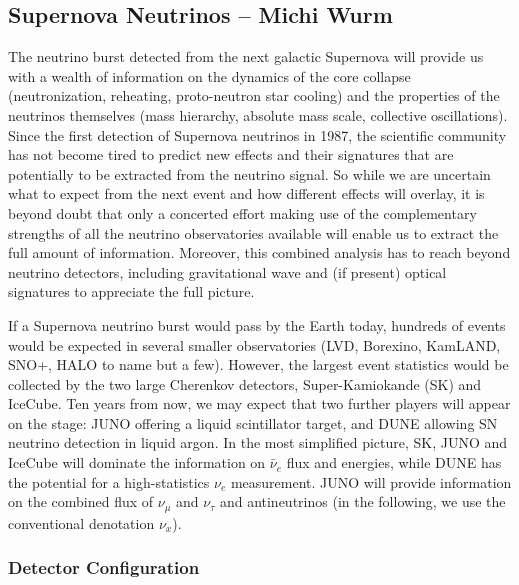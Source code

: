 \subsection{Supernova Neutrinos -- Michi Wurm}


The neutrino burst detected from the next galactic Supernova will provide us with a wealth of information on the dynamics of the core collapse (neutronization, reheating, proto-neutron star cooling) and the properties of the neutrinos themselves (mass hierarchy, absolute mass scale, collective oscillations). Since the first detection of Supernova neutrinos in 1987, the scientific community has not become tired to predict new effects and their signatures that are potentially to be extracted from the neutrino signal. So while we are uncertain what to expect from the next event and how different effects will overlay, it is beyond doubt that only a concerted effort making use of the complementary strengths of all the neutrino observatories available will enable us to extract the full amount of information. Moreover, this combined analysis has to reach beyond neutrino detectors, including gravitational wave and (if present) optical signatures to appreciate the full picture.

If a Supernova neutrino burst would pass by the Earth today, hundreds of events would be expected in several smaller observatories (LVD, Borexino, KamLAND, SNO+, HALO to name but a few). However, the largest event statistics would be collected by the two large Cherenkov detectors, Super-Kamiokande (SK) and IceCube. Ten years from now, we may expect that two further players will appear on the stage: JUNO offering a liquid scintillator target, and DUNE allowing SN neutrino detection in liquid argon. In the most simplified picture, SK, JUNO and IceCube will dominate the information on $\bar\nu_e$ flux and energies, while DUNE has the potential for a high-statistics $\nu_e$ measurement. JUNO will provide information on the combined flux of $\nu_\mu$ and $\nu_\tau$ and antineutrinos (in the following, we use the conventional denotation $\nu_x$).

\subsubsection{Detector Configuration}

